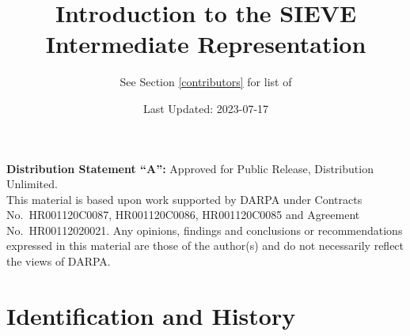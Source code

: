 \documentclass[12pt]{article}
\title{Introduction to the SIEVE Intermediate Representation}
\author{See Section \ref{contributors} for list of \nameref{contributors}}
\date{Last Updated: 2023-07-17}
\begin{document}
\maketitle

\textbf{Distribution Statement ``A'':} Approved for Public Release, Distribution Unlimited.\\

This material is based upon work supported by DARPA under Contracts No.~HR001120C0087, HR001120C0086, HR001120C0085 and Agreement No.~HR00112020021.  Any opinions, findings and conclusions or recommendations expressed in this material are those of the author(s) and do not necessarily reflect the views of DARPA.

\section*{Identification and History}\label{history}
\end{document}

